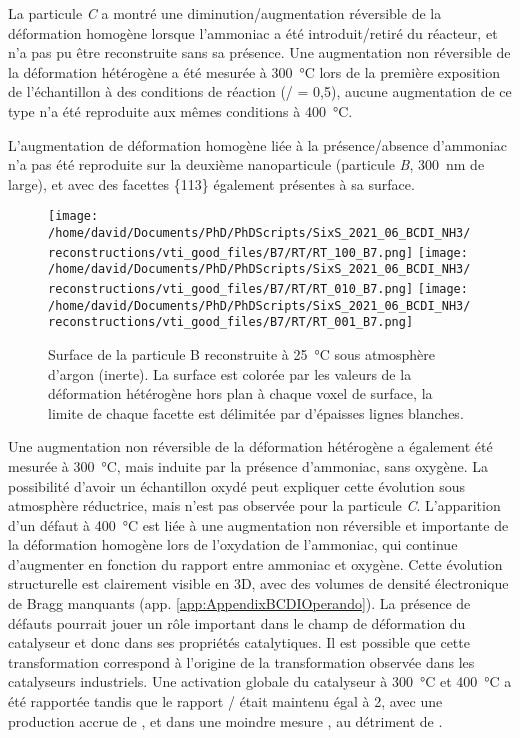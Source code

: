 {La particule \textit{C} a montré une diminution/augmentation réversible de la déformation homogène lorsque l'ammoniac a été introduit/retiré du réacteur, et n'a pas pu être reconstruite sans sa présence.
Une augmentation non réversible de la déformation hétérogène a été mesurée à \qty{300}{\degreeCelsius} lors de la première exposition de l'échantillon à des conditions de réaction (/ = 0,5), aucune augmentation de ce type n'a été reproduite aux mêmes conditions à \qty{400}{\degreeCelsius}.

L'augmentation de déformation homogène liée à la présence/absence d'ammoniac n'a pas été reproduite sur la deuxième nanoparticule (particule \textit{B}, \qty{300}{\nm} de large), et avec des facettes \{113\} également présentes à sa surface.

\begin{figure}[!htb]
    \centering
    \texttt{[image: /home/david/Documents/PhD/PhDScripts/SixS\_2021\_06\_BCDI\_NH3/reconstructions/vti\_good\_files/B7/RT/RT\_100\_B7.png]}
    \texttt{[image: /home/david/Documents/PhD/PhDScripts/SixS\_2021\_06\_BCDI\_NH3/reconstructions/vti\_good\_files/B7/RT/RT\_010\_B7.png]}
    \texttt{[image: /home/david/Documents/PhD/PhDScripts/SixS\_2021\_06\_BCDI\_NH3/reconstructions/vti\_good\_files/B7/RT/RT\_001\_B7.png]}
    \caption{
        Surface de la particule B reconstruite à \qty{25}{\degreeCelsius} sous atmosphère d'argon (inerte).
        La surface est colorée par les valeurs de la déformation hétérogène hors plan à chaque voxel de surface, la limite de chaque facette est délimitée par d'épaisses lignes blanches.
    }
    \label{fig:B7FacetsFr}
\end{figure}

Une augmentation non réversible de la déformation hétérogène a également été mesurée à \qty{300}{\degreeCelsius}, mais induite par la présence d'ammoniac, sans oxygène.
La possibilité d'avoir un échantillon oxydé peut expliquer cette évolution sous atmosphère réductrice, mais n'est pas observée pour la particule \textit{C}.
L'apparition d'un défaut à \qty{400}{\degreeCelsius} est liée à une augmentation non réversible et importante de la déformation homogène lors de l'oxydation de l'ammoniac, qui continue d'augmenter en fonction du rapport entre ammoniac et oxygène.
Cette évolution structurelle est clairement visible en 3D, avec des volumes de densité électronique de Bragg manquants (app. \ref{app:AppendixBCDIOperando}).
La présence de défauts pourrait jouer un rôle important dans le champ de déformation du catalyseur et donc dans ses propriétés catalytiques.
Il est possible que cette transformation correspond à l'origine de la transformation observée dans les catalyseurs industriels.
Une activation globale du catalyseur à \qty{300}{\degreeCelsius} et \qty{400}{\degreeCelsius} a été rapportée tandis que le rapport / était maintenu égal à 2, avec une production accrue de , et dans une moindre mesure , au détriment de .

}

